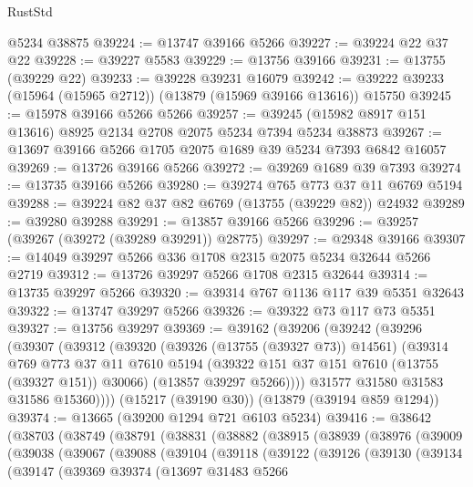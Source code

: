 \begin{lexlean}{RustStd}
\begin{coremodule}
    @5234
    @38875
@39224 := @13747 @39166 @5266
@39227 := @39224 @22 @37 @22
@39228 := @39227 @5583
@39229 := @13756 @39166
@39231 := @13755 (@39229 @22)
@39233 := @39228 @39231 @16079
@39242 := @39222 @39233 (@15964 (@15965 @2712)) (@13879 (@15969 @39166 @13616)) @15750
@39245 := @15978 @39166 @5266 @5266
@39257 := @39245 (@15982 @8917 @151 @13616) @8925 @2134 @2708 @2075 @5234 @7394 @5234 @38873
@39267 := @13697 @39166 @5266 @1705 @2075 @1689 @39 @5234 @7393 @6842 @16057
@39269 := @13726 @39166 @5266
@39272 := @39269 @1689 @39 @7393
@39274 := @13735 @39166 @5266
@39280 := @39274 @765 @773 @37 @11 @6769 @5194
@39288 := @39224 @82 @37 @82 @6769 (@13755 (@39229 @82)) @24932
@39289 := @39280 @39288
@39291 := @13857 @39166 @5266
@39296 := @39257 (@39267 (@39272 (@39289 @39291)) @28775)
@39297 := @29348 @39166
@39307 := @14049 @39297 @5266 @336 @1708 @2315 @2075 @5234 @32644 @5266 @2719
@39312 := @13726 @39297 @5266 @1708 @2315 @32644
@39314 := @13735 @39297 @5266
@39320 := @39314 @767 @1136 @117 @39 @5351 @32643
@39322 := @13747 @39297 @5266
@39326 := @39322 @73 @117 @73 @5351
@39327 := @13756 @39297
@39369 := @39162
    (@39206
      (@39242
        (@39296
          (@39307
            (@39312
              (@39320
                (@39326 (@13755 (@39327 @73)) @14561)
                (@39314
                  @769
                  @773
                  @37
                  @11
                  @7610
                  @5194
                  (@39322 @151 @37 @151 @7610 (@13755 (@39327 @151)) @30066)
                  (@13857 @39297 @5266))))
            @31577
            @31580
            @31583
            @31586
            @15360))))
    (@15217 (@39190 @30))
    (@13879 (@39194 @859 @1294))
@39374 := @13665 (@39200 @1294 @721 @6103 @5234)
@39416 := @38642
    (@38703
      (@38749
        (@38791
          (@38831
            (@38882
              (@38915
                (@38939
                  (@38976
                    (@39009
                      (@39038
                        (@39067
                          (@39088
                            (@39104
                              (@39118
                                (@39122
                                  (@39126
                                    (@39130
                                      (@39134
                                        (@39147
                                          (@39369
                                            @39374
                                            (@13697
                                              @31483
                                              @5266

\end{coremodule}
\end{lexlean}
